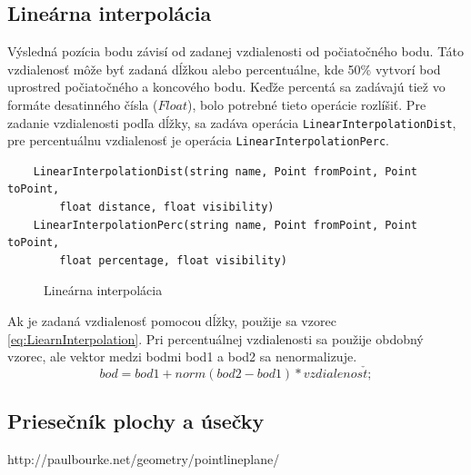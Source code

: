 \subsection{Lineárna interpolácia}
Výsledná pozícia bodu závisí od zadanej vzdia\-le\-nos\-ti od počiatočného bodu. Táto vzdia\-le\-nosť môže byť zadaná dĺžkou alebo percentuálne, kde 50\% vytvorí bod uprostred počiatočného a koncového bodu. 
Keďže percentá sa zadávajú tiež vo formáte desatinného čísla ($Float$), bolo potrebné tieto operácie rozlíšiť. Pre zadanie vzdialenosti podľa dĺžky, sa zadáva operácia \texttt{LinearInterpolationDist}, 
pre percentuálnu vzdialenosť je operácia \texttt{LinearInterpolationPerc}.
\begin{lstlisting}
    LinearInterpolationDist(string name, Point fromPoint, Point toPoint,
        float distance, float visibility)
    LinearInterpolationPerc(string name, Point fromPoint, Point toPoint,
        float percentage, float visibility)
\end{lstlisting}


\begin{figure}[H]
	\centering
	\caption{Lineárna interpolácia}
	\label{fig:1}
\end{figure}

Ak je zadaná vzdialenosť pomocou dĺžky, použije sa vzorec \ref{eq:LiearnInterpolation}. Pri percentuálnej vzdialenosti sa použije obdobný vzorec, ale vektor medzi bodmi bod1 a bod2 sa nenormalizuje.
\begin{equation}
    bod = bod1 + norm(bod2 - bod1) * vzdialenos\check{t};
	\label{eq:LiearnInterpolation}
\end{equation}


\subsection{Priesečník plochy a úsečky}
http://paulbourke.net/geometry/pointlineplane/

